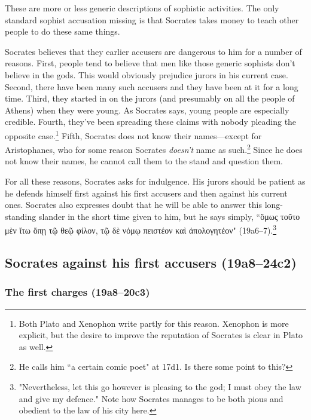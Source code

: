 \documentclass[11pt]{article}
\begin{document}
These are more or less generic descriptions of sophistic activities.  The only standard sophist accusation missing is that Socrates takes money to teach other people to do these same things.

Socrates believes that they earlier accusers are dangerous to him for a number of reasons.  First, people tend to believe that men like those generic sophists don't believe in the gods.  This would obviously prejudice jurors in his current case.  Second, there have been many such accusers and they have been at it for a long time.  Third, they started in on the jurors (and presumably on all the people of Athens) when they were young.  As Socrates says, young people are especially credible.  Fourth, they've been spreading these claims with nobody pleading the opposite case.\footnote{Both Plato and Xenophon write partly for this reason.  Xenophon is more explicit, but the desire to improve the reputation of Socrates is clear in Plato as well.}  Fifth, Socrates does not know their names---except for Aristophanes, who for some reason Socrates \emph{doesn't} name as such.\footnote{He calls him ``a certain comic poet" at 17d1.  Is there some point to this?}  Since he does not know their names, he cannot call them to the stand and question them.

For all these reasons, Socrates asks for indulgence.  His jurors should be patient as he defends himself first against his first accusers and then against his current ones.  Socrates also expresses doubt that he will be able to answer this long-standing slander in the short time given to him, but he says simply, ``{\g ὅμως τοῦτο μὲν ἴτω ὅπῃ τῷ θεῷ φίλον, τῷ δὲ νόμῳ πειστέον καὶ ἀπολογητέον}" (19a6--7).\footnote{"Nevertheless, let this go however is pleasing to the god; I must obey the law and give my defence." Note how Socrates manages to be both pious and obedient to the law of his city here.}


\subsection{Socrates against his first accusers (19a8--24c2)}

\subsubsection{The first charges (19a8--20c3)}
\end{document}
